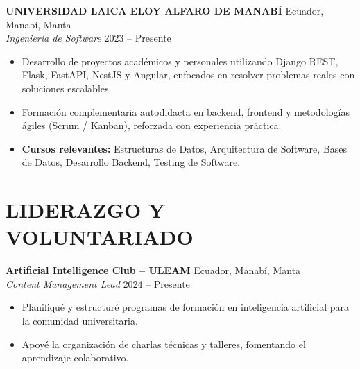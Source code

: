 \documentclass[11pt, a4paper]{article}
\begin{document}
\textbf{UNIVERSIDAD LAICA ELOY ALFARO DE MANABÍ} \hfill Ecuador, Manabí, Manta \\
\textit{Ingeniería de Software} \hfill 2023 -- Presente

\begin{itemize}
\item Desarrollo de proyectos académicos y personales utilizando Django REST, Flask, FastAPI, NestJS y Angular, enfocados en resolver problemas reales con soluciones escalables.
\item Formación complementaria autodidacta en backend, frontend y metodologías ágiles (Scrum / Kanban), reforzada con experiencia práctica.
\item \textbf{Cursos relevantes:} Estructuras de Datos, Arquitectura de Software, Bases de Datos, Desarrollo Backend, Testing de Software.
\end{itemize}

\section*{LIDERAZGO Y VOLUNTARIADO}

\textbf{Artificial Intelligence Club -- ULEAM} \hfill Ecuador, Manabí, Manta \\
\textit{Content Management Lead} \hfill 2024 -- Presente

\begin{itemize}
\item Planifiqué y estructuré programas de formación en inteligencia artificial para la comunidad universitaria.
\item Apoyé la organización de charlas técnicas y talleres, fomentando el aprendizaje colaborativo.
\end{itemize}
\end{document}
